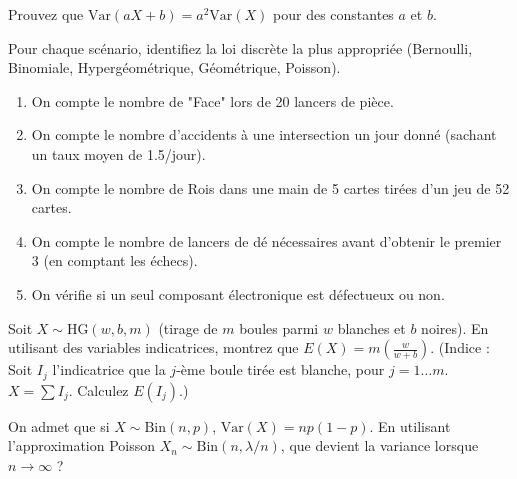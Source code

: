 \begin{exercicebox}
Prouvez que $\text{Var}(aX + b) = a^2 \text{Var}(X)$ pour des constantes $a$ et $b$.
\end{exercicebox}


\begin{exercicebox}
Pour chaque scénario, identifiez la loi discrète la plus appropriée (Bernoulli, Binomiale, Hypergéométrique, Géométrique, Poisson).
\begin{enumerate}
    \item On compte le nombre de "Face" lors de 20 lancers de pièce.
    \item On compte le nombre d'accidents à une intersection un jour donné (sachant un taux moyen de 1.5/jour).
    \item On compte le nombre de Rois dans une main de 5 cartes tirées d'un jeu de 52 cartes.
    \item On compte le nombre de lancers de dé nécessaires avant d'obtenir le premier 3 (en comptant les échecs).
    \item On vérifie si un seul composant électronique est défectueux ou non.
\end{enumerate}
\end{exercicebox}

\begin{exercicebox}
Soit $X \sim \text{HG}(w, b, m)$ (tirage de $m$ boules parmi $w$ blanches et $b$ noires).
En utilisant des variables indicatrices, montrez que $E(X) = m \left( \frac{w}{w+b} \right)$.
(Indice : Soit $I_j$ l'indicatrice que la $j$-ème boule tirée est blanche, pour $j=1 \dots m$. $X = \sum I_j$. Calculez $E(I_j)$.)
\end{exercicebox}

\begin{exercicebox}
On admet que si $X \sim \text{Bin}(n, p)$, $\text{Var}(X) = np(1-p)$.
En utilisant l'approximation Poisson $X_n \sim \text{Bin}(n, \lambda/n)$, que devient la variance lorsque $n \to \infty$ ?
\end{exercicebox}


